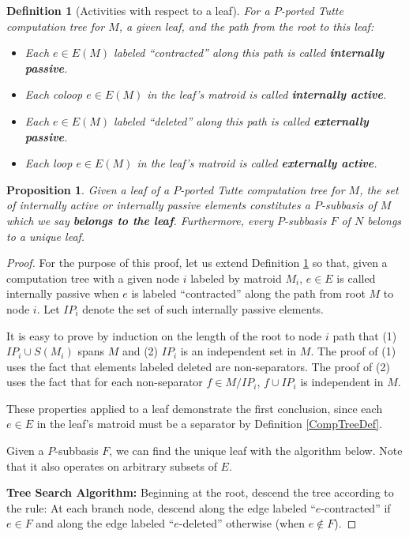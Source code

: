 \documentclass[12pt,leqno]{amsart}
\newtheorem{prop}[lem]{Proposition}
\newtheorem{definition}[lem]{Definition}
\theoremstyle{remark}
\begin{document}
\begin{definition}[Activities with respect to a leaf]
\label{ActivityTreeDef}
For a $P$-ported Tutte computation tree for $M$,
a given leaf, and the path from the root to this leaf:
\begin{itemize}
\item Each $e\in E(M)$ labeled ``contracted'' along this path
is called \textbf{internally passive}.
\item Each coloop $e\in E(M)$ in the leaf's matroid is
called \textbf{internally active}.
\item Each $e\in E(M)$ labeled ``deleted'' along this path
is called \textbf{externally passive}.
\item Each loop $e\in E(M)$ in the leaf's matroid is
called \textbf{externally active}.
\end{itemize}
\end{definition}

\begin{prop}
Given a leaf of a $P$-ported Tutte computation tree for $M$,
the set of internally active or internally passive elements 
constitutes a 
$P$-subbasis of $M$ which we say 
\textbf{belongs to the leaf}.  
Furthermore, every $P$-subbasis $F$ of $N$ belongs to a unique leaf.
\end{prop}

\begin{proof}
For the purpose of this proof, let us extend Definition \ref{ActivityTreeDef}
so that, given a computation tree with a given node $i$ 
labeled by matroid $M_i$,
$e\in E$ is called internally passive when $e$ is labeled 
``contracted'' along the path from root $M$ to
node $i$.  Let $IP_i$ denote the set of such internally passive 
elements.

It is easy to prove by induction on the length of the root to node $i$ path
that
(1) $IP_i\cup S(M_i)$ spans $M$ and 
(2) $IP_i$ is an independent set in $M$.  The proof
of (1) uses the fact that elements labeled deleted are non-separators.  The
proof of (2) uses the fact that for each non-separator 
$f\in M/IP_i$, $f\cup IP_i$ is independent in $M$.

These properties applied to a leaf demonstrate the first conclusion,
since each $e\in E$ in the leaf's matroid must be a separator by Definition 
\ref{CompTreeDef}.

Given a $P$-subbasis $F$, we can find the unique leaf with the
algorithm below.  Note that it also operates on arbitrary subsets of $E$.

\textbf{Tree Search Algorithm:} Beginning
at the root, descend the tree according to the rule: At each branch node,
descend along the edge labeled ``$e$-contracted'' if $e\in F$ and along
the edge labeled ``$e$-deleted'' otherwise (when $e\not\in F$).
\end{proof}
\end{document}
